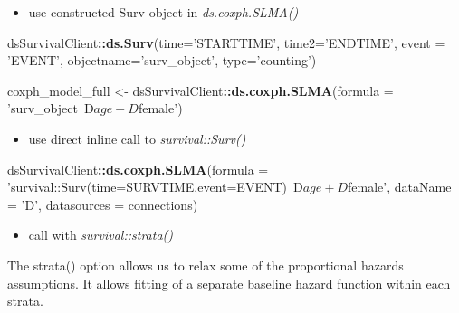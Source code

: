 \documentclass[
]{article}
\newenvironment{Shaded}{\begin{snugshade}}{\end{snugshade}}
\newcommand{\DataTypeTok}[1]{\textcolor[rgb]{0.13,0.29,0.53}{#1}}
\newcommand{\KeywordTok}[1]{\textcolor[rgb]{0.13,0.29,0.53}{\textbf{#1}}}
\newcommand{\NormalTok}[1]{#1}
\newcommand{\OperatorTok}[1]{\textcolor[rgb]{0.81,0.36,0.00}{\textbf{#1}}}
\newcommand{\StringTok}[1]{\textcolor[rgb]{0.31,0.60,0.02}{#1}}
\providecommand{\tightlist}{%
  \setlength{\itemsep}{0pt}\setlength{\parskip}{0pt}}
\begin{document}
\begin{itemize}
\tightlist
\item
  use constructed Surv object in \emph{ds.coxph.SLMA()}
\end{itemize}

\begin{Shaded}
\begin{Highlighting}[]
\NormalTok{dsSurvivalClient}\OperatorTok{::}\KeywordTok{ds.Surv}\NormalTok{(}\DataTypeTok{time=}\StringTok{'STARTTIME'}\NormalTok{, }\DataTypeTok{time2=}\StringTok{'ENDTIME'}\NormalTok{, }
                      \DataTypeTok{event =} \StringTok{'EVENT'}\NormalTok{, }\DataTypeTok{objectname=}\StringTok{'surv_object'}\NormalTok{,}
                      \DataTypeTok{type=}\StringTok{'counting'}\NormalTok{)}
              
\NormalTok{coxph_model_full <-}\StringTok{ }\NormalTok{dsSurvivalClient}\OperatorTok{::}\KeywordTok{ds.coxph.SLMA}\NormalTok{(}\DataTypeTok{formula =} \StringTok{'surv_object~D$age+D$female'}\NormalTok{)}
\end{Highlighting}
\end{Shaded}

\begin{itemize}
\tightlist
\item
  use direct inline call to \emph{survival::Surv()}
\end{itemize}

\begin{Shaded}
\begin{Highlighting}[]
\NormalTok{dsSurvivalClient}\OperatorTok{::}\KeywordTok{ds.coxph.SLMA}\NormalTok{(}\DataTypeTok{formula =} \StringTok{'survival::Surv(time=SURVTIME,event=EVENT)~D$age+D$female'}\NormalTok{, }
                                \DataTypeTok{dataName =} \StringTok{'D'}\NormalTok{, }
                                \DataTypeTok{datasources =}\NormalTok{ connections)}
\end{Highlighting}
\end{Shaded}

\begin{itemize}
\tightlist
\item
  call with \emph{survival::strata()}
\end{itemize}

The strata() option allows us to relax some of the proportional hazards
assumptions. It allows fitting of a separate baseline hazard function
within each strata.

\begin{Shaded}
\end{Shaded}
\end{document}
